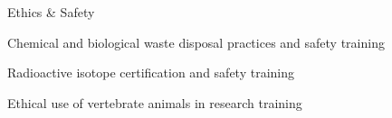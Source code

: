 
\begin{cvitems}

	\cvitem
		{Ethics \& Safety}
		{\item Chemical and biological waste disposal practices and safety training}
	\cvitem
		{}
		{\item Radioactive isotope certification and safety training}
	\cvitem
		{}
		{\item Ethical use of vertebrate animals in research training}

\end{cvitems}
